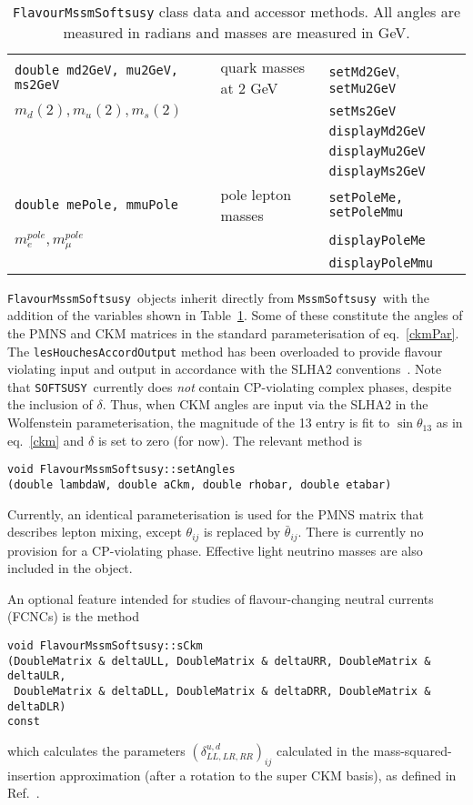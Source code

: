 \documentclass{article}
\def\SOFTSUSY{{\tt SOFTSUSY}}
\def\code#1{\small{\tt #1}\normalsize}
\begin{document}
\begin{table}
\begin{center}
\begin{tabular}{lll}
\code{double md2GeV, mu2GeV, ms2GeV} & quark masses at 2 GeV &
\code{setMd2GeV}, \code{setMu2GeV} \\
$m_d(2), m_u(2), m_s(2)$ 
 & & \code{setMs2GeV} \\
 & & \code{displayMd2GeV} \\
 & & \code{displayMu2GeV} \\
 & & \code{displayMs2GeV} \\ \hline
\code{double mePole, mmuPole} & pole lepton masses & \code{setPoleMe,
  setPoleMmu} \\
$m_e^{pole}, m_\mu^{pole}$ & & \code{displayPoleMe} \\
 & & \code{displayPoleMmu} \\
\end{tabular}\caption{\label{tab:flavsoft}\code{FlavourMssmSoftsusy} class data and accessor methods. All angles are
  measured in radians and masses are measured in GeV.}\end{center}\end{table}
\code{FlavourMssmSoftsusy}~objects inherit directly from
\code{MssmSoftsusy}~with the addition of the variables shown in
Table~\ref{tab:flavsoft}.
Some of these
constitute the angles of the PMNS and CKM matrices in the standard
parameterisation of 
eq.~\ref{ckmPar}. The
\code{lesHouchesAccordOutput} method has been overloaded to provide flavour
violating input and output in accordance with the SLHA2
conventions~\cite{lhacc2}. Note that \SOFTSUSY~currently does {\em not}\/
contain CP-violating complex phases, despite the inclusion of $\delta$. Thus,
when CKM angles are input via the 
SLHA2 in the Wolfenstein parameterisation, the magnitude of the 13 entry 
is fit to $\sin \theta_{13}$ as in eq.~\ref{ckm} and $\delta$ is set to zero
(for now). The relevant method is
\small
\begin{verbatim}
void FlavourMssmSoftsusy::setAngles
(double lambdaW, double aCkm, double rhobar, double etabar) 
\end{verbatim}
\normalsize
Currently, an identical parameterisation is used for the PMNS
matrix that describes lepton mixing, except $\theta_{ij}$ is replaced by
${\bar \theta}_{ij}$. There is currently no provision for a CP-violating phase. 
Effective light neutrino masses 
are also included in the object. 

An optional feature intended for studies of flavour-changing neutral
currents (FCNCs) is the method 
\begin{verbatim}
void FlavourMssmSoftsusy::sCkm
(DoubleMatrix & deltaULL, DoubleMatrix & deltaURR, DoubleMatrix & deltaULR, 
 DoubleMatrix & deltaDLL, DoubleMatrix & deltaDRR, DoubleMatrix & deltaDLR) 
const
\end{verbatim}
which calculates the parameters $(\delta^{u,d}_{LL,LR,RR})_{ij}$ calculated in
the mass-squared-insertion 
approximation (after a rotation to the super CKM basis), as defined
in Ref.~\cite{Gabbiani:1996hi}. 
\end{document}
